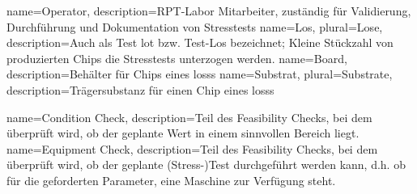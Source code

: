 {
    name=Operator,
    description={RPT-Labor Mitarbeiter, zuständig für Validierung, Durchführung und Dokumentation von Stresstests}
}
{
    name=Los,
    plural=Lose,
    description={Auch als Test lot bzw. Test-Los bezeichnet; Kleine Stückzahl von produzierten Chips die Stresstests unterzogen werden.}
}
{
    name=Board,
    description={Behälter für Chips eines \glspl{los}s}
}
{
    name=Substrat,
    plural=Substrate,
    description={Trägersubstanz für einen Chip eines \glspl{los}s}
}

{
    name=Condition Check,
    description={Teil des Feasibility Checks, bei dem überprüft wird, ob der geplante Wert in einem sinnvollen Bereich liegt.}
}
{
    name=Equipment Check,
    description={Teil des Feasibility Checks, bei dem überprüft wird, ob der geplante (Stress-)Test durchgeführt werden kann, d.h. ob für die geforderten Parameter, eine Maschine zur Verfügung steht.}
}



